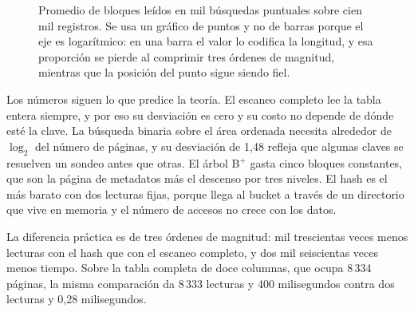 \documentclass[a4paper,12pt]{article}
\begin{document}
\begin{figure}[H]
\centering
{}
\caption{Promedio de bloques leídos en mil búsquedas puntuales sobre cien mil
registros. Se usa un gráfico de puntos y no de barras porque el eje es
logarítmico: en una barra el valor lo codifica la longitud, y esa proporción se
pierde al comprimir tres órdenes de magnitud, mientras que la posición del
punto sigue siendo fiel.}
\label{fig:e2}
\end{figure}

Los números siguen lo que predice la teoría. El escaneo completo lee la tabla
entera siempre, y por eso su desviación es cero y su costo no depende de dónde
esté la clave. La búsqueda binaria sobre el área ordenada necesita alrededor de
$\log_2$ del número de páginas, y su desviación de 1{,}48 refleja que algunas
claves se resuelven un sondeo antes que otras. El árbol B$^+$ gasta cinco
bloques constantes, que son la página de metadatos más el descenso por tres
niveles. El hash es el más barato con dos lecturas fijas, porque llega al bucket
a través de un directorio que vive en memoria y el número de accesos no crece
con los datos.

La diferencia práctica es de tres órdenes de magnitud: mil trescientas veces
menos lecturas con el hash que con el escaneo completo, y dos mil seiscientas
veces menos tiempo. Sobre la tabla completa de doce columnas, que ocupa 8\,334
páginas, la misma comparación da 8\,333 lecturas y 400 milisegundos contra dos
lecturas y 0{,}28 milisegundos.
\end{document}
